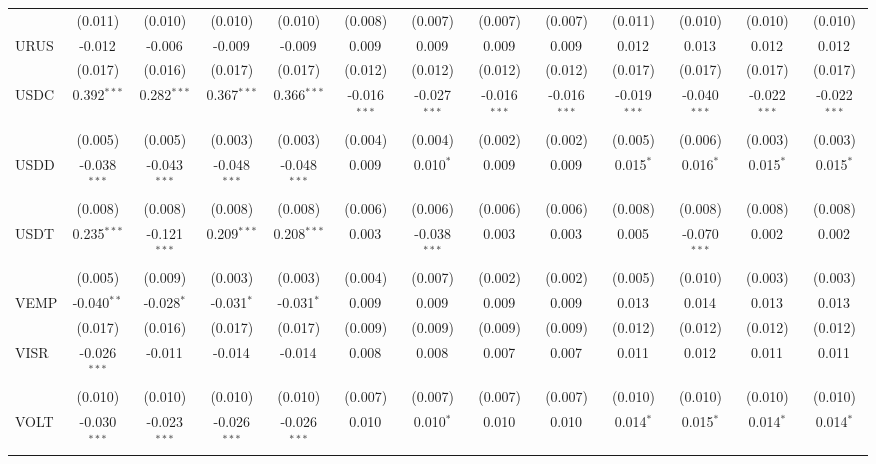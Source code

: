 \begin{table}[!htbp]
\begin{tabular}{@{\extracolsep{5pt}}lcccccccccccc}
  & (0.011) & (0.010) & (0.010) & (0.010) & (0.008) & (0.007) & (0.007) & (0.007) & (0.011) & (0.010) & (0.010) & (0.010) \\
 URUS & -0.012$^{}$ & -0.006$^{}$ & -0.009$^{}$ & -0.009$^{}$ & 0.009$^{}$ & 0.009$^{}$ & 0.009$^{}$ & 0.009$^{}$ & 0.012$^{}$ & 0.013$^{}$ & 0.012$^{}$ & 0.012$^{}$ \\
  & (0.017) & (0.016) & (0.017) & (0.017) & (0.012) & (0.012) & (0.012) & (0.012) & (0.017) & (0.017) & (0.017) & (0.017) \\
 USDC & 0.392$^{***}$ & 0.282$^{***}$ & 0.367$^{***}$ & 0.366$^{***}$ & -0.016$^{***}$ & -0.027$^{***}$ & -0.016$^{***}$ & -0.016$^{***}$ & -0.019$^{***}$ & -0.040$^{***}$ & -0.022$^{***}$ & -0.022$^{***}$ \\
  & (0.005) & (0.005) & (0.003) & (0.003) & (0.004) & (0.004) & (0.002) & (0.002) & (0.005) & (0.006) & (0.003) & (0.003) \\
 USDD & -0.038$^{***}$ & -0.043$^{***}$ & -0.048$^{***}$ & -0.048$^{***}$ & 0.009$^{}$ & 0.010$^{*}$ & 0.009$^{}$ & 0.009$^{}$ & 0.015$^{*}$ & 0.016$^{*}$ & 0.015$^{*}$ & 0.015$^{*}$ \\
  & (0.008) & (0.008) & (0.008) & (0.008) & (0.006) & (0.006) & (0.006) & (0.006) & (0.008) & (0.008) & (0.008) & (0.008) \\
 USDT & 0.235$^{***}$ & -0.121$^{***}$ & 0.209$^{***}$ & 0.208$^{***}$ & 0.003$^{}$ & -0.038$^{***}$ & 0.003$^{}$ & 0.003$^{}$ & 0.005$^{}$ & -0.070$^{***}$ & 0.002$^{}$ & 0.002$^{}$ \\
  & (0.005) & (0.009) & (0.003) & (0.003) & (0.004) & (0.007) & (0.002) & (0.002) & (0.005) & (0.010) & (0.003) & (0.003) \\
 VEMP & -0.040$^{**}$ & -0.028$^{*}$ & -0.031$^{*}$ & -0.031$^{*}$ & 0.009$^{}$ & 0.009$^{}$ & 0.009$^{}$ & 0.009$^{}$ & 0.013$^{}$ & 0.014$^{}$ & 0.013$^{}$ & 0.013$^{}$ \\
  & (0.017) & (0.016) & (0.017) & (0.017) & (0.009) & (0.009) & (0.009) & (0.009) & (0.012) & (0.012) & (0.012) & (0.012) \\
 VISR & -0.026$^{***}$ & -0.011$^{}$ & -0.014$^{}$ & -0.014$^{}$ & 0.008$^{}$ & 0.008$^{}$ & 0.007$^{}$ & 0.007$^{}$ & 0.011$^{}$ & 0.012$^{}$ & 0.011$^{}$ & 0.011$^{}$ \\
  & (0.010) & (0.010) & (0.010) & (0.010) & (0.007) & (0.007) & (0.007) & (0.007) & (0.010) & (0.010) & (0.010) & (0.010) \\
 VOLT & -0.030$^{***}$ & -0.023$^{***}$ & -0.026$^{***}$ & -0.026$^{***}$ & 0.010$^{}$ & 0.010$^{*}$ & 0.010$^{}$ & 0.010$^{}$ & 0.014$^{*}$ & 0.015$^{*}$ & 0.014$^{*}$ & 0.014$^{*}$ \\

\end{tabular}
\end{table}
